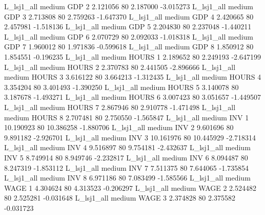     L_lsj1_all     medium      GDP                 2  2.121056 80       2.187000          -3.015273
    L_lsj1_all     medium      GDP                 3  2.713808 80       2.759263          -1.647370
    L_lsj1_all     medium      GDP                 4  2.420665 80       2.457981          -1.518136
    L_lsj1_all     medium      GDP                 5  2.204830 80       2.237048          -1.440211
    L_lsj1_all     medium      GDP                 6  2.070729 80       2.092033          -1.018318
    L_lsj1_all     medium      GDP                 7  1.960012 80       1.971836          -0.599618
    L_lsj1_all     medium      GDP                 8  1.850912 80       1.854551          -0.196235
    L_lsj1_all     medium    HOURS                 1  2.189652 80       2.249193          -2.647199
    L_lsj1_all     medium    HOURS                 2  2.370783 80       2.441505          -2.896666
    L_lsj1_all     medium    HOURS                 3  3.616122 80       3.664213          -1.312435
    L_lsj1_all     medium    HOURS                 4  3.354204 80       3.401493          -1.390250
    L_lsj1_all     medium    HOURS                 5  3.140078 80       3.187678          -1.493271
    L_lsj1_all     medium    HOURS                 6  3.007423 80       3.051657          -1.449507
    L_lsj1_all     medium    HOURS                 7  2.867946 80       2.910778          -1.471498
    L_lsj1_all     medium    HOURS                 8  2.707481 80       2.750550          -1.565847
    L_lsj1_all     medium      INV                 1 10.190923 80      10.386258          -1.880706
    L_lsj1_all     medium      INV                 2  9.601696 80       9.891182          -2.926701
    L_lsj1_all     medium      INV                 3 10.161976 80      10.445929          -2.718314
    L_lsj1_all     medium      INV                 4  9.516897 80       9.754181          -2.432637
    L_lsj1_all     medium      INV                 5  8.749914 80       8.949746          -2.232817
    L_lsj1_all     medium      INV                 6  8.094487 80       8.247319          -1.853112
    L_lsj1_all     medium      INV                 7  7.511375 80       7.644065          -1.735854
    L_lsj1_all     medium      INV                 8  6.971186 80       7.083499          -1.585566
    L_lsj1_all     medium     WAGE                 1  4.304624 80       4.313523          -0.206297
    L_lsj1_all     medium     WAGE                 2  2.524482 80       2.525281          -0.031648
    L_lsj1_all     medium     WAGE                 3  2.374828 80       2.375582          -0.031723
